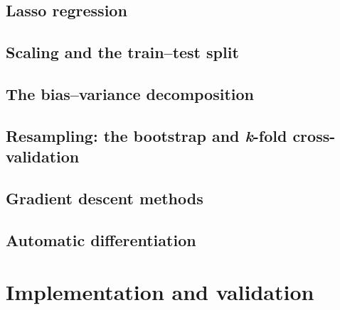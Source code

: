 \documentclass[aps,rmp,reprint,amsmath,amssymb,graphicx,longbibliography]{revtex4-1}
\begin{document}
\subsection{Lasso regression}

\subsection{Scaling and the train--test split}

\subsection{The bias--variance decomposition}

\subsection{Resampling: the bootstrap and \textit{k}-fold cross-validation}

\subsection{Gradient descent methods}

\subsection{Automatic differentiation}

\section{Implementation and validation}\label{sec:code}
\end{document}
